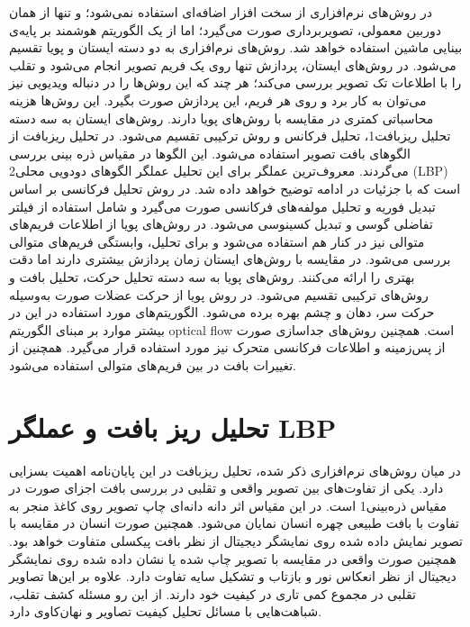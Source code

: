 در روش‌های نرم‌افزاری از سخت افزار اضافه‌ای استفاده نمی‌شود؛ و تنها از همان دوربین معمولی، تصویربرداری صورت می‌گیرد؛ اما از یک الگوریتم هوشمند بر پایه‌ی بینایی ماشین استفاده خواهد شد. روش‌های نرم‌افزاری به دو دسته ایستان و پویا تقسیم می‌شود.
در روش‌های ایستان، پردازش تنها روی یک فریم تصویر انجام می‌شود و تقلب را با اطلاعات تک تصویر بررسی می‌کند؛ هر چند که این روش‌ها را در دنباله ویدیویی نیز می‌توان به کار برد و روی هر فریم، این پردازش صورت بگیرد. این روش‌ها هزینه محاسباتی کمتری در مقایسه با روش‌های پویا دارند. روش‌های ایستان به سه دسته تحلیل ریزبافت1، تحلیل فرکانس و روش ترکیبی تقسیم می‌شود.
در تحلیل ریزبافت از الگوهای بافت تصویر استفاده می‌شود. این الگوها در مقیاس ذره بینی بررسی می‌گردند. معروف‌ترین عملگر برای این تحلیل عملگر الگوهای دودویی محلی2 (LBP) است که با جزئیات در ادامه توضیح خواهد داده شد.
در روش تحلیل فرکانسی بر اساس تبدیل فوریه و تحلیل مولفه‌های فرکانسی صورت می‌گیرد و شامل استفاده از فیلتر تفاضلی گوسی و تبدیل کسینوسی می‌شود.
در روش‌های پویا از اطلاعات فریم‌های متوالی نیز در کنار هم استفاده می‌شود و برای تحلیل، وابستگی فریم‌های متوالی بررسی می‌شود. در مقایسه با روش‌های ایستان زمان پردازش بیشتری دارند اما دقت بهتری را ارائه می‌کنند. روش‌های پویا به سه دسته تحلیل حرکت، تحلیل بافت و روش‌های ترکیبی تقسیم می‌شود.
در روش پویا از حرکت عضلات صورت به‌وسیله حرکت سر، دهان و چشم بهره برده می‌شود. الگوریتم‌های مورد استفاده در این در بیشتر موارد بر مبنای الگوریتم optical flow است. همچنین روش‌های جداسازی صورت از پس‌زمینه و اطلاعات فرکانسی متحرک نیز مورد استفاده قرار می‌گیرد. همچنین از تغییرات بافت در بین فریم‌های متوالی استفاده می‌شود.
\section{تحلیل ریز بافت و عملگر LBP}
در میان روش‌های نرم‌افزاری ذکر شده، تحلیل ریزبافت در این پایان‌نامه اهمیت بسزایی دارد. یکی از تفاوت‌های بین تصویر واقعی و تقلبی در بررسی بافت اجزای صورت در مقیاس ذره‌بینی1 است. در این مقیاس اثر دانه دانه‌ای چاپ تصویر روی کاغذ منجر به تفاوت با بافت طبیعی چهره انسان نمایان می‌شود. همچنین صورت انسان در مقایسه با تصویر نمایش داده شده روی نمایشگر دیجیتال از نظر بافت پیکسلی متفاوت خواهد بود. همچنین صورت واقعی در مقایسه با تصویر چاپ شده یا نشان داده شده روی نمایشگر دیجیتال از نظر انعکاس نور و بازتاب و تشکیل سایه تفاوت دارد. علاوه بر این‌ها تصاویر تقلبی در مجموع کمی تاری در کیفیت خود دارند. از این رو مسئله کشف تقلب، شباهت‌هایی با مسائل تحلیل کیفیت تصاویر و نهان‌کاوی دارد.

